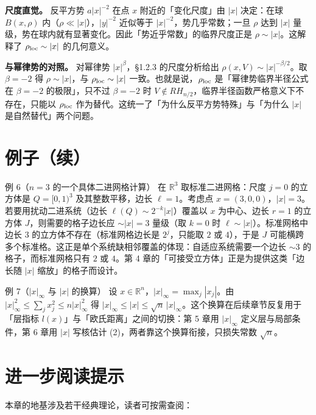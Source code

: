 \documentclass[a4paper,11pt,openany]{ctexbook}
\numberwithin{equation}{chapter}
\numberwithin{figure}{chapter}
\numberwithin{table}{chapter}
\begin{document}
\textbf{尺度直觉。} 反平方势 $a|x|^{-2}$ 在点 $x$ 附近的「变化尺度」由 $|x|$ 决定：在球 $B(x,\rho)$ 内（$\rho\ll|x|$），$|y|^{-2}$ 近似等于 $|x|^{-2}$，势几乎常数；一旦 $\rho$ 达到 $|x|$ 量级，势在球内就有显著变化。因此「势近乎常数」的临界尺度正是 $\rho\sim|x|$。这解释了 $\rho_{\rm loc}\sim|x|$ 的几何意义。

\textbf{与幂律势的对照。} 对幂律势 $|x|^\beta$，§1.2.3 的尺度分析给出 $\rho(x,V)\sim|x|^{-\beta/2}$。取 $\beta=-2$ 得 $\rho\sim|x|$，与 $\rho_{\rm loc}\sim|x|$ 一致。也就是说，$\rho_{\rm loc}$ 是「幂律势临界半径公式在 $\beta=-2$ 的极限」，只不过 $\beta=-2$ 时 $V\notin RH_{n/2}$，临界半径函数严格意义下不存在，只能以 $\rho_{\rm loc}$ 作为替代。这统一了「为什么反平方势特殊」与「为什么 $|x|$ 是自然替代」两个问题。

\section{例子（续）}

\begin{examplebox}{例 6（$n=3$ 的一个具体二进网格计算）}
在 $\mathbb R^3$ 取标准二进网格：尺度 $j=0$ 的立方体是 $Q=[0,1)^3$ 及其整数平移，边长 $\ell=1$。考虑点 $x=(3,0,0)$，$|x|=3$。若要用扰动二进系统（边长 $\ell(Q)\sim2^{-k}|x|$）覆盖以 $x$ 为中心、边长 $r=1$ 的立方体 $J$，则需要的格子边长应 $\sim|x|=3$ 量级（取 $k=0$ 时 $\ell\sim|x|$）。标准网格中边长 $3$ 的立方体不存在（标准网格边长是 $2^j$，只能取 $2$ 或 $4$），于是 $J$ 可能横跨多个标准格。这正是单个系统缺相邻覆盖的体现：自适应系统需要一个边长 $\sim3$ 的格子，而标准网格只有 $2$ 或 $4$。第 4 章的「可接受立方体」正是为提供这类「边长随 $|x|$ 缩放」的格子而设计。
\end{examplebox}

\begin{examplebox}{例 7（$|x|_\infty$ 与 $|x|$ 的换算）}
设 $x\in\mathbb R^n$，$|x|_\infty=\max_j|x_j|$。由 $|x|_\infty^2\le\sum_j x_j^2\le n|x|_\infty^2$ 得 $|x|_\infty\le|x|\le\sqrt n\,|x|_\infty$。这个换算在后续章节反复用于「层指标 $l(x)$」与「欧氏距离」之间的切换：第 5 章用 $|x|_\infty$ 定义层与局部条件，第 6 章用 $|x|$ 写核估计 (2)，两者靠这个换算衔接，只损失常数 $\sqrt n$。
\end{examplebox}

\section{进一步阅读提示}

本章的地基涉及若干经典理论，读者可按需查阅：
\end{document}
